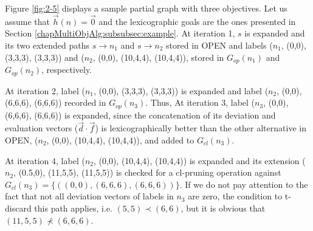 \begin{ejemplo}\label{chapMultiObjAlg:ej:dev-op-pruning}
Figure \ref{fig:2-5} displays a sample partial graph with three objectives. Let us assume that $\vec h(n) = \vec 0$ and the lexicographic goals are the ones presented in Section \ref{chapMultiObjAlg:subsubsec:example}. At iteration 1, $s$ is expanded and its two extended paths $s \rightarrow n_1$ and $s \rightarrow n_2$ stored in OPEN and labels ($n_1$, (0,0), (3,3,3), (3,3,3)) and ($n_2$, (0,0), (10,4,4), (10,4,4)), stored in $G_{op}(n_1)$ and $G_{op}(n_2)$, respectively.

At iteration 2, label ($n_1$, (0,0), (3,3,3), (3,3,3)) is expanded and label ($n_2$, (0,0), (6,6,6), (6,6,6)) recorded in $G_{op}(n_3)$. Thus,  At iteration 3, label ($n_3$, (0,0), (6,6,6), (6,6,6)) is expanded, since the concatenation of its deviation and evaluation vectors ($\vec d \cdot \vec f$) is lexicographically better than the other alternative in OPEN, ($n_2$, (0,0), (10,4,4), (10,4,4)), and added to $G_{cl}(n_3)$.

At iteration 4, label ($n_2$, (0,0), (10,4,4), (10,4,4)) is expanded and its extension ($n_2$, (0.5,0), (11,5,5), (11,5,5)) is checked for a cl-pruning operation against $G_{cl}(n_3) = \{((0,0), (6,6,6), (6,6,6)) \}$. If we do not pay attention to the fact that not all deviation vectors of labels in $n_3$ are zero, the condition to t-discard this path applies, i.e. $(5,5) \prec (6,6)$, but it is obvious that $(11,5,5) \nprec (6,6,6)$. 
\end{ejemplo}


